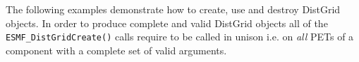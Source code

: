 
The following examples demonstrate how to create, use and destroy DistGrid objects. In order to produce complete and valid DistGrid objects all of the {\tt ESMF\_DistGridCreate()} calls require to be called in unison i.e. on {\em all} PETs of a component with a complete set of valid arguments.
